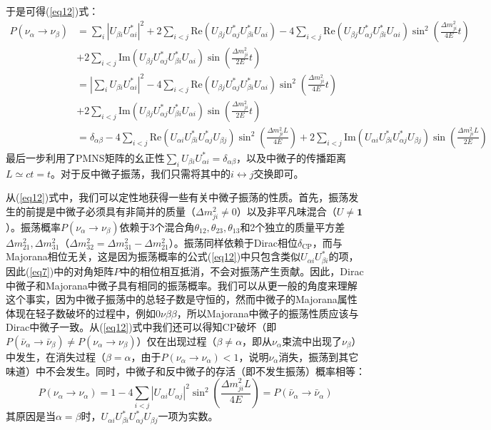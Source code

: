 \documentclass{article}
\begin{document}
	于是可得(\ref{eq12})式：
	\begin{equation*}
		\begin{aligned}
			P(\nu_\alpha\to\nu_\beta)&=\sum_i\left|U_{\beta i}U_{\alpha i}^*\right|^2+2\sum_{i<j}\mathrm{Re}\left(U_{\beta j}U_{\alpha j}^*U_{\beta i}^* U_{\alpha i}\right)-4\sum_{i<j}\mathrm{Re}\left(U_{\beta j}U_{\alpha j}^*U_{\beta i}^* U_{\alpha i}\right)\sin^2\left(\frac{\Delta m_{ji}^2}{4E}t\right)\\
			&+2\sum_{i<j}\mathrm{Im}\left(U_{\beta j}U_{\alpha j}^*U_{\beta i}^* U_{\alpha i}\right)\sin\left(\frac{\Delta m_{ji}^2}{2E}t\right)\\
			&=\left|\sum_iU_{\beta i}U_{\alpha i}^*\right|^2-4\sum_{i<j}\mathrm{Re}\left(U_{\beta j}U_{\alpha j}^*U_{\beta i}^* U_{\alpha i}\right)\sin^2\left(\frac{\Delta m_{ji}^2}{4E}t\right)\\
			&+2\sum_{i<j}\mathrm{Im}\left(U_{\beta j}U_{\alpha j}^*U_{\beta i}^* U_{\alpha i}\right)\sin\left(\frac{\Delta m_{ji}^2}{2E}t\right)\\
			&=\delta_{\alpha\beta}-4\sum_{i<j}\mathrm{Re}(U_{\alpha i}U_{\beta i}^\ast U_{\alpha j}^\ast U_{\beta j})\sin^2\left(\frac{\Delta m_{ji}^2L}{4E}\right)+2\sum_{i<j}\mathrm{Im}(U_{\alpha i}U_{\beta i}^\ast U_{\alpha j}^\ast U_{\beta j})\sin\left(\frac{\Delta m_{ji}^2L}{2E}\right)
		\end{aligned}
	\end{equation*}
	最后一步利用了PMNS矩阵的幺正性$\sum_iU_{\beta i}U_{\alpha i}^*=\delta_{\alpha\beta}$，以及中微子的传播距离$L\simeq ct=t$。对于反中微子振荡，我们只需将其中的$i\leftrightarrow j$交换即可。
	
	从(\ref{eq12})式中，我们可以定性地获得一些有关中微子振荡的性质。首先，振荡发生的前提是中微子必须具有非简并的质量（$\Delta m_{ji}^2\ne0$）以及非平凡味混合（$U\ne\mathbf{1}$）。振荡概率$P(\nu_\alpha\to\nu_\beta)$依赖于3个混合角$\theta_{12},\theta_{23},\theta_{13}$和2个独立的质量平方差$\Delta m_{21}^2,\Delta m_{31}^2$（$\Delta m_{32}^2=\Delta m_{31}^2-\Delta m_{21}^2$）。振荡同样依赖于Dirac相位$\delta_\mathrm{CP}$，而与Majorana相位无关，这是因为振荡概率的公式(\ref{eq12})中只包含类似$U_{\alpha i}U_{\beta i}^*$的项，因此(\ref{eq7})中的对角矩阵$P$中的相位相互抵消，不会对振荡产生贡献。因此，Dirac中微子和Majorana中微子具有相同的振荡概率。我们可以从更一般的角度来理解这个事实，因为中微子振荡中的总轻子数是守恒的，然而中微子的Majorana属性体现在轻子数破坏的过程中，例如$0\nu\beta\beta$，所以Majorana中微子的振荡性质应该与Dirac中微子一致。从(\ref{eq12})式中我们还可以得知CP破坏（即$P(\bar{\nu}_\alpha\to\bar{\nu}_\beta)\ne P(\nu_\alpha\to\nu_\beta)$）仅在出现过程（$\beta\ne\alpha$，即从$\nu_\alpha$束流中出现了$\nu_\beta$）中发生，在消失过程（$\beta=\alpha$，由于$P(\nu_\alpha\to\nu_\alpha)<1$，说明$\nu_\alpha$消失，振荡到其它味道）中不会发生。同时，中微子和反中微子的存活（即不发生振荡）概率相等：
		\begin{equation}
			P(\nu_\alpha\to\nu_\alpha)=1-4\sum_{i<j}|U_{\alpha i}U_{\alpha j}|^2\sin^2\left(\frac{\Delta m_{ji}^2L}{4E}\right)=P(\bar{\nu}_\alpha\to\bar{\nu}_\alpha)
			\label{eq13}
		\end{equation}
		其原因是当$\alpha=\beta$时，$U_{\alpha i}U_{\beta i}^*U_{\alpha j}^*U_{\beta j}$一项为实数。
		
\end{document}
